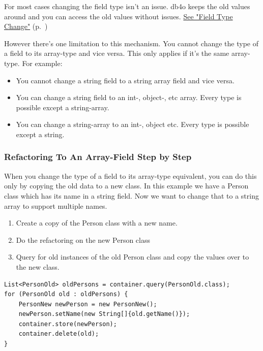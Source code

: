 For most cases changing the field type isn't an issue. db4o keeps the old values around and you can access the old values without issues. \hyperref[ref:advanced-topics-refactoring-and-schema-evolution-field-type-change]{See "Field Type Change"} (p.~\pageref{ref:advanced-topics-refactoring-and-schema-evolution-field-type-change})

However there's one limitation to this mechanism. You cannot change the type of a field to its array-type and vice versa. This only applies if it's the same array-type. For example:

\begin{itemize}
\item You cannot change a string field to a string array field and vice versa.
\item You can change a string field to an int-, object-, etc array. Every type is possible except a string-array.
\item You can change a string-array to an int-, object etc. Every type is possible except a string.
\end{itemize}

\subsubsection*{Refactoring To An Array-Field Step by Step}

When you change the type of a field to its array-type equivalent, you can do this only by copying the old data to a new class. In this example we have a Person class which has its name in a string field. Now we want to change that to a string array to support multiple names.

\begin{enumerate}
\item Create a copy of the Person class with a new name.
\item Do the refactoring on the new Person class
\item Query for old instances of the old Person class and copy the values over to the new class.
\end{enumerate}

\begin{lstlisting}
List<PersonOld> oldPersons = container.query(PersonOld.class);
for (PersonOld old : oldPersons) {
    PersonNew newPerson = new PersonNew();
    newPerson.setName(new String[]{old.getName()});
    container.store(newPerson);
    container.delete(old);
}
\end{lstlisting}

